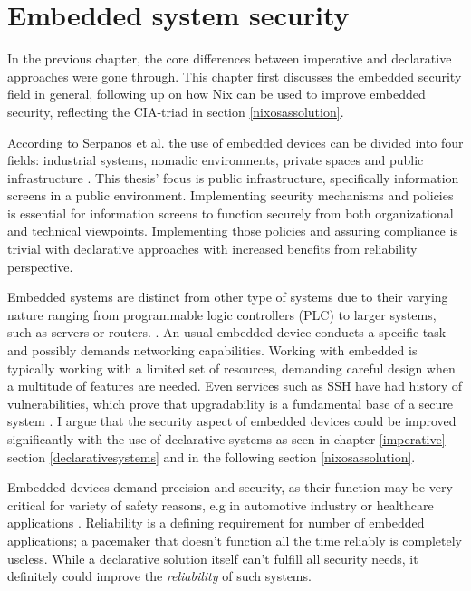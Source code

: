\chapter{Embedded system security} \label{embedded}

In the previous chapter, the core differences between imperative and
declarative approaches were gone through. This chapter first discusses
the embedded security field in general, following up on how Nix can be
used to improve embedded security, reflecting the CIA-triad in section
\ref{nixosassolution}.

According to Serpanos et al. the use of embedded devices can be
divided into four fields: industrial systems, nomadic environments,
private spaces and public infrastructure
\cite{serpanos2013security}. This thesis' focus is public
infrastructure, specifically information screens in a public
environment. Implementing security mechanisms and policies is
essential for information screens to function securely from both
organizational and technical viewpoints. Implementing those policies
and assuring compliance is trivial with declarative approaches with
increased benefits from reliability perspective.

Embedded systems are distinct from other type of systems due to their
varying nature ranging from programmable logic controllers (PLC) to
larger systems, such as servers or
routers. \cite{fysarakis2014embedded}. An usual embedded device
conducts a specific task and possibly demands networking
capabilities. Working with embedded is typically working with a
limited set of resources, demanding careful design when a multitude of
features are needed. Even services such as SSH have
had history of vulnerabilities, which prove that upgradability is a
fundamental base of a secure system
\cite{secopsolutionHistorySecOps}. I argue that the security aspect of
embedded devices could be improved significantly with the use of
declarative systems as seen in chapter \ref{imperative} section
\ref{declarativesystems} and in the following section
\ref{nixosassolution}.

Embedded devices demand precision and security, as their function may
be very critical for variety of safety reasons, e.g in automotive
industry or healthcare applications \cite{turab2019secure,
  fysarakis2014embedded}. Reliability is a defining requirement for
number of embedded applications; a pacemaker that doesn't function all
the time reliably is completely useless. While a declarative solution
itself can't fulfill all security needs, it definitely could improve
the \textit{reliability} of such systems.

